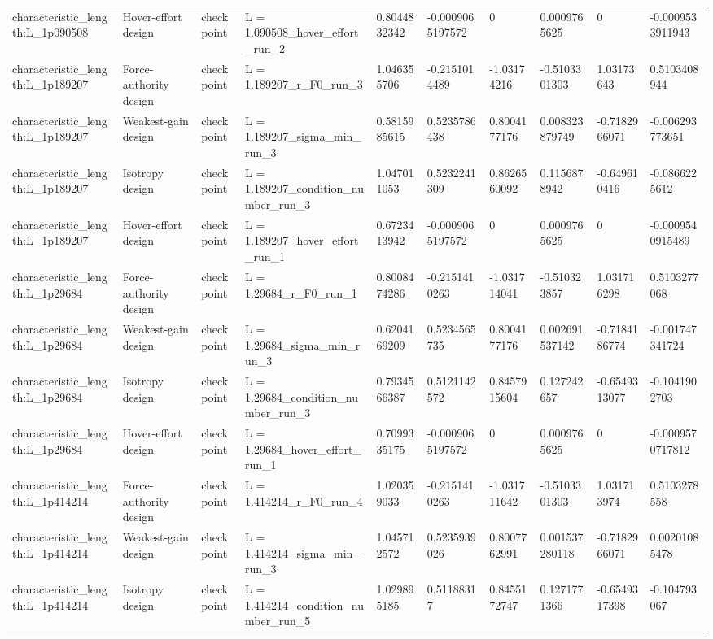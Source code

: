 \begin{tabular}{@{}llllllllll@{}}
characteristic\_length:L\_1p090508 & Hover-effort design & checkpoint & L = 1.090508\_hover\_effort\_run\_2 & 0.8044832342 & -0.0009065197572 & 0 & 0.0009765625 & 0 & -0.0009533911943 \\
characteristic\_length:L\_1p189207 & Force-authority design & checkpoint & L = 1.189207\_r\_F0\_run\_3 & 1.046355706 & -0.2151014489 & -1.03174216 & -0.5103301303 & 1.03173643 & 0.5103408944 \\
characteristic\_length:L\_1p189207 & Weakest-gain design & checkpoint & L = 1.189207\_sigma\_min\_run\_3 & 0.5815985615 & 0.5235786438 & 0.8004177176 & 0.008323879749 & -0.7182966071 & -0.006293773651 \\
characteristic\_length:L\_1p189207 & Isotropy design & checkpoint & L = 1.189207\_condition\_number\_run\_3 & 1.047011053 & 0.5232241309 & 0.8626560092 & 0.1156878942 & -0.649610416 & -0.0866225612 \\
characteristic\_length:L\_1p189207 & Hover-effort design & checkpoint & L = 1.189207\_hover\_effort\_run\_1 & 0.6723413942 & -0.0009065197572 & 0 & 0.0009765625 & 0 & -0.0009540915489 \\
characteristic\_length:L\_1p29684 & Force-authority design & checkpoint & L = 1.29684\_r\_F0\_run\_1 & 0.8008474286 & -0.2151410263 & -1.031714041 & -0.510323857 & 1.031716298 & 0.5103277068 \\
characteristic\_length:L\_1p29684 & Weakest-gain design & checkpoint & L = 1.29684\_sigma\_min\_run\_3 & 0.6204169209 & 0.5234565735 & 0.8004177176 & 0.002691537142 & -0.7184186774 & -0.001747341724 \\
characteristic\_length:L\_1p29684 & Isotropy design & checkpoint & L = 1.29684\_condition\_number\_run\_3 & 0.7934566387 & 0.5121142572 & 0.8457915604 & 0.127242657 & -0.6549313077 & -0.1041902703 \\
characteristic\_length:L\_1p29684 & Hover-effort design & checkpoint & L = 1.29684\_hover\_effort\_run\_1 & 0.7099335175 & -0.0009065197572 & 0 & 0.0009765625 & 0 & -0.0009570717812 \\
characteristic\_length:L\_1p414214 & Force-authority design & checkpoint & L = 1.414214\_r\_F0\_run\_4 & 1.020359033 & -0.2151410263 & -1.031711642 & -0.5103301303 & 1.031713974 & 0.5103278558 \\
characteristic\_length:L\_1p414214 & Weakest-gain design & checkpoint & L = 1.414214\_sigma\_min\_run\_3 & 1.045712572 & 0.5235939026 & 0.8007762991 & 0.001537280118 & -0.7182966071 & 0.00201085478 \\
characteristic\_length:L\_1p414214 & Isotropy design & checkpoint & L = 1.414214\_condition\_number\_run\_5 & 1.029895185 & 0.51188317 & 0.8455172747 & 0.1271771366 & -0.6549317398 & -0.104793067 \\

\end{tabular}
